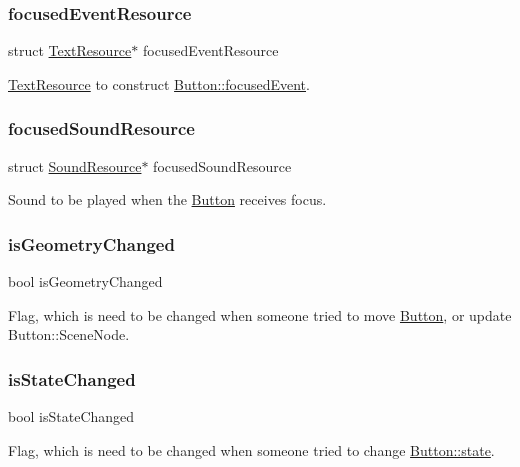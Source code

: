 \subsubsection{\texorpdfstring{focused\+Event\+Resource}{focusedEventResource}}
{\footnotesize\ttfamily struct \hyperlink{struct_text_resource}{Text\+Resource}$\ast$ focused\+Event\+Resource}

\hyperlink{struct_text_resource}{Text\+Resource} to construct \hyperlink{struct_button_af8909553495b609dc7c9efd469ffc31d}{Button\+::focused\+Event}. \hypertarget{struct_button_a8848ee5b886f588a966fc6c3ff0270df}{}\label{struct_button_a8848ee5b886f588a966fc6c3ff0270df} 
\subsubsection{\texorpdfstring{focused\+Sound\+Resource}{focusedSoundResource}}
{\footnotesize\ttfamily struct \hyperlink{struct_sound_resource}{Sound\+Resource}$\ast$ focused\+Sound\+Resource}

Sound to be played when the \hyperlink{struct_button}{Button} receives focus. \hypertarget{struct_button_a8ea7e8ac3e3330830aa7a4309390f3ac}{}\label{struct_button_a8ea7e8ac3e3330830aa7a4309390f3ac} 
\subsubsection{\texorpdfstring{is\+Geometry\+Changed}{isGeometryChanged}}
{\footnotesize\ttfamily bool is\+Geometry\+Changed}

Flag, which is need to be changed when someone tried to move \hyperlink{struct_button}{Button}, or update Button\+::\+Scene\+Node. \hypertarget{struct_button_abbe46dfeadc7ca8af4ccd6a1e60fa560}{}\label{struct_button_abbe46dfeadc7ca8af4ccd6a1e60fa560} 
\subsubsection{\texorpdfstring{is\+State\+Changed}{isStateChanged}}
{\footnotesize\ttfamily bool is\+State\+Changed}

Flag, which is need to be changed when someone tried to change \hyperlink{struct_button_a98525fefb11846bc0e1ee154b0a106d4}{Button\+::state}. \hypertarget{struct_button_ab278201aa1758916bc9e825b3833e31b}{}\label{struct_button_ab278201aa1758916bc9e825b3833e31b} 

